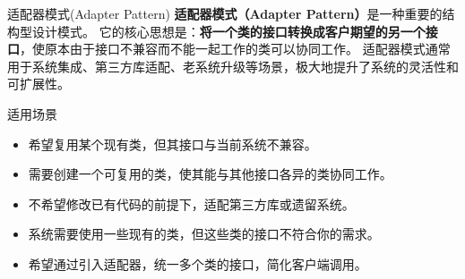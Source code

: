 \documentclass[UTF8,aspectratio=169]{beamer}
\begin{document}
\begin{frame}{适配器模式(Adapter Pattern)}
    \textbf{适配器模式（Adapter Pattern）}是一种重要的结构型设计模式。
    它的核心思想是：\textbf{将一个类的接口转换成客户期望的另一个接口}，使原本由于接口不兼容而不能一起工作的类可以协同工作。
    适配器模式通常用于系统集成、第三方库适配、老系统升级等场景，极大地提升了系统的灵活性和可扩展性。

    \begin{ytublock}{适用场景}
        \begin{itemize}
            \item 希望复用某个现有类，但其接口与当前系统不兼容。
            \item 需要创建一个可复用的类，使其能与其他接口各异的类协同工作。
            \item 不希望修改已有代码的前提下，适配第三方库或遗留系统。
            \item 系统需要使用一些现有的类，但这些类的接口不符合你的需求。
            \item 希望通过引入适配器，统一多个类的接口，简化客户端调用。
        \end{itemize}
    \end{ytublock}
\end{frame}
\end{document}
